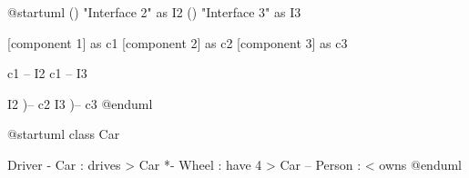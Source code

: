 \documentclass{scrartcl}
\begin{document}
	\begin{plantuml}
		@startuml
		() "Interface 2" as I2
		() "Interface 3" as I3

		[component 1] as c1
		[component 2] as c2
		[component 3] as c3

		c1 -- I2
		c1 -- I3

		I2 )-- c2
		I3 )-- c3
		@enduml
	\end{plantuml}

\newpage

	\begin{plantuml}
		@startuml
		class Car

		Driver - Car : drives >
		Car *- Wheel : have 4 >
		Car -- Person : < owns
		@enduml
	\end{plantuml}
\end{document}
